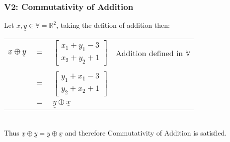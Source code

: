 \documentclass{article}
\begin{document}
\subsubsection*{V2: Commutativity of Addition}
Let $\underline{x},\underline{y}\in \mathbb{V}=\mathbb{R}^{2}$, taking the defition of addition then:
\begin{table}[htp]
\centering
\begin{tabular}{cclc}
   $\underline{x}\oplus\underline{y}$ & $=$  & $\begin{bmatrix} x_1 + y_1 - 3 \\ x_2 + y_2 + 1 \end{bmatrix}$  & Addition defined in $\mathbb{V}$  \\
   &&&\\
   & $=$  &  $\begin{bmatrix} y_1 + x_1 - 3 \\ y_2 + x_2 + 1 \end{bmatrix}$ &   \\
   & $=$ & $\underline{y}\oplus\underline{x}$&
\end{tabular}
\end{table}\\
Thus $\underline{x}\oplus\underline{y}=\underline{y}\oplus\underline{x}$ and therefore Commutativity of Addition is satisfied.
\end{document}
